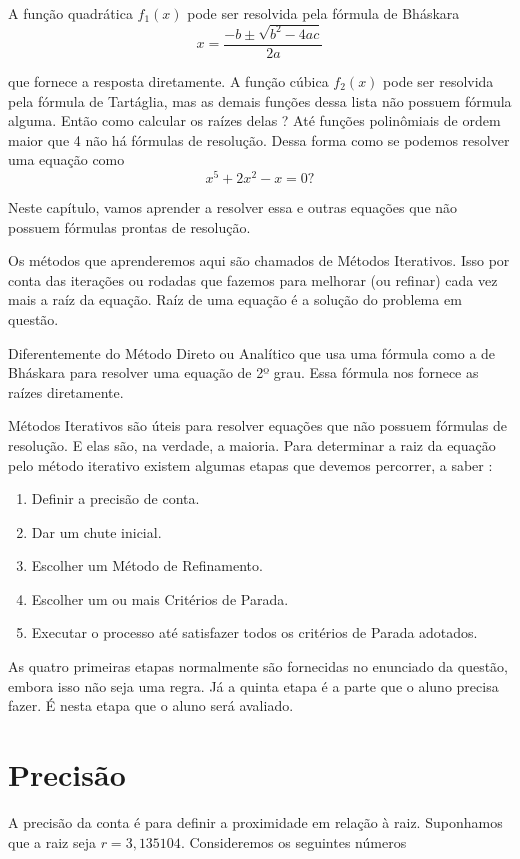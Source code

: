 \documentclass[
  letterpaper,
  DIV=11,
  numbers=noendperiod]{scrreprt}
\begin{document}
A função quadrática \(f_{1}(x)\) pode ser resolvida pela fórmula de
Bháskara \[x=\frac{-b\pm \sqrt{b^2-4ac}}{2a}\]

que fornece a resposta diretamente. A função cúbica \(f_{2}(x)\) pode
ser resolvida pela fórmula de Tartáglia, mas as demais funções dessa
lista não possuem fórmula alguma. Então como calcular os raízes delas ?
Até funções polinômiais de ordem maior que 4 não há fórmulas de
resolução. Dessa forma como se podemos resolver uma equação como
\[x^5+2x^2-x=0  ?\]

Neste capítulo, vamos aprender a resolver essa e outras equações que não
possuem fórmulas prontas de resolução.

Os métodos que aprenderemos aqui são chamados de Métodos Iterativos.
Isso por conta das iterações ou rodadas que fazemos para melhorar (ou
refinar) cada vez mais a raíz da equação. Raíz de uma equação é a
solução do problema em questão.

Diferentemente do Método Direto ou Analítico que usa uma fórmula como a
de Bháskara para resolver uma equação de 2º grau. Essa fórmula nos
fornece as raízes diretamente.

Métodos Iterativos são úteis para resolver equações que não possuem
fórmulas de resolução. E elas são, na verdade, a maioria. Para
determinar a raiz da equação pelo método iterativo existem algumas
etapas que devemos percorrer, a saber :

\begin{enumerate}
\def\labelenumi{\arabic{enumi}.}
\item
  Definir a precisão de conta.
\item
  Dar um chute inicial.
\item
  Escolher um Método de Refinamento.
\item
  Escolher um ou mais Critérios de Parada.
\item
  Executar o processo até satisfazer todos os critérios de Parada
  adotados.
\end{enumerate}

As quatro primeiras etapas normalmente são fornecidas no enunciado da
questão, embora isso não seja uma regra. Já a quinta etapa é a parte que
o aluno precisa fazer. É nesta etapa que o aluno será avaliado.

\section{Precisão}\label{precisuxe3o}

A precisão da conta é para definir a proximidade em relação à raiz.
Suponhamos que a raiz seja \(r=3,135104\). Consideremos os seguintes
números
\end{document}
